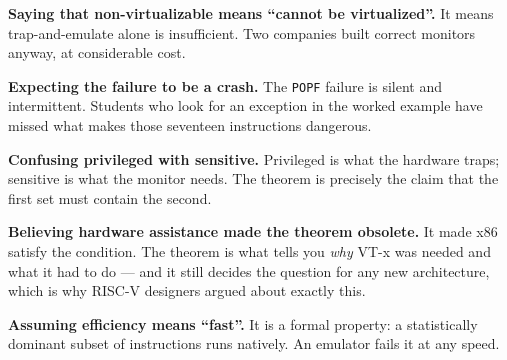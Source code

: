 \begin{pitfall}
\begin{tight}
  \item \textbf{Saying that non-virtualizable means ``cannot be
        virtualized''.} It means trap-and-emulate alone is insufficient. Two
        companies built correct monitors anyway, at considerable cost.
  \item \textbf{Expecting the failure to be a crash.} The \texttt{POPF} failure
        is silent and intermittent. Students who look for an exception in the
        worked example have missed what makes those seventeen instructions
        dangerous.
  \item \textbf{Confusing privileged with sensitive.} Privileged is what the
        hardware traps; sensitive is what the monitor needs. The theorem is
        precisely the claim that the first set must contain the second.
  \item \textbf{Believing hardware assistance made the theorem obsolete.} It
        made x86 satisfy the condition. The theorem is what tells you
        \emph{why} VT-x was needed and what it had to do --- and it still
        decides the question for any new architecture, which is why RISC-V
        designers argued about exactly this.
  \item \textbf{Assuming efficiency means ``fast''.} It is a formal property:
        a statistically dominant subset of instructions runs natively. An
        emulator fails it at any speed.
\end{tight}
\end{pitfall}

